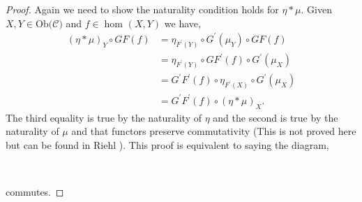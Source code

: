 \documentclass[11pt,a4paper]{article}
\theoremstyle{definition}
\newcommand\ho[3][]{\hom_{#1}(#2,#3)}
\newcommand\ob[1]{\mathrm{Ob(}#1\mathrm{)}}
\newcommand\cat[1]{\mathscr{#1}}
\numberwithin{equation}{section}
\begin{document}
\begin{proof}
Again we need to show the naturality condition holds for $\eta*\mu$. Given $X,Y\in\ob{\cat{C}}$ and $f\in\ho{X}{Y}$ we have,
\begin{align*}
    (\eta*\mu)_{Y} \circ GF(f) &= \eta_{F^{\prime}(Y)}\circ G^\prime(\mu_{Y}) \circ GF(f)\\
    &=\eta_{F^{\prime}(Y)}\circ GF^{\prime}(f)\circ G^{\prime}(\mu_{X})\\
    &= G^{\prime}F^{\prime}(f)\circ \eta_{F^{\prime}(X)}\circ G^{\prime}(\mu_{X})\\
    &= G^{\prime}F^{\prime}(f) \circ (\eta*\mu)_{X}.
\end{align*}
The third equality is true by the naturality of $\eta$ and the second is true by the naturality of $\mu$ and that functors preserve commutativity (This is not proved here but can be found in Riehl \cite{Riehl}).
This proof is equivalent to saying the diagram,
\begin{center}
\\
\end{center}
commutes.
\end{proof}

\end{document}
